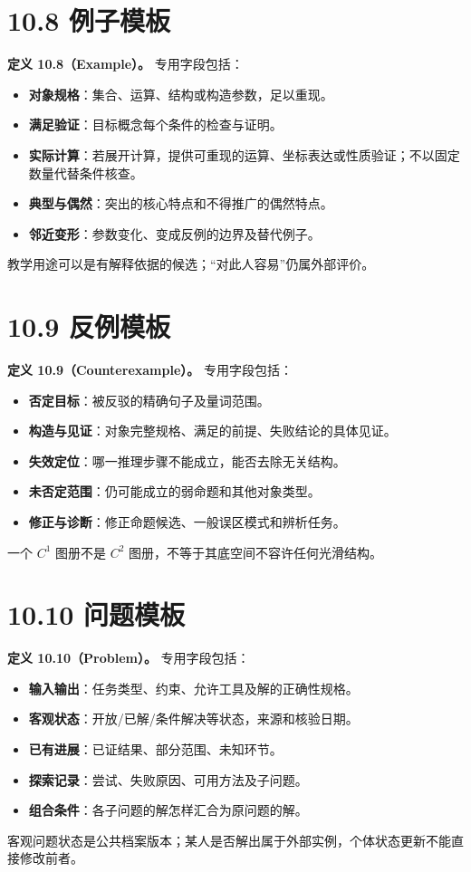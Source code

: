 \documentclass[UTF8,a4paper,zihao=-4,fontset=windows,openany]{ctexbook}
\begin{document}
\section{10.8 例子模板}
\textbf{定义 10.8（Example）。} 专用字段包括：

\begin{itemize}
\item \textbf{对象规格}：集合、运算、结构或构造参数，足以重现。
\item \textbf{满足验证}：目标概念每个条件的检查与证明。
\item \textbf{实际计算}：若展开计算，提供可重现的运算、坐标表达或性质验证；不以固定数量代替条件核查。
\item \textbf{典型与偶然}：突出的核心特点和不得推广的偶然特点。
\item \textbf{邻近变形}：参数变化、变成反例的边界及替代例子。
\end{itemize}
教学用途可以是有解释依据的候选；“对此人容易”仍属外部评价。

\section{10.9 反例模板}
\textbf{定义 10.9（Counterexample）。} 专用字段包括：

\begin{itemize}
\item \textbf{否定目标}：被反驳的精确句子及量词范围。
\item \textbf{构造与见证}：对象完整规格、满足的前提、失败结论的具体见证。
\item \textbf{失效定位}：哪一推理步骤不能成立，能否去除无关结构。
\item \textbf{未否定范围}：仍可能成立的弱命题和其他对象类型。
\item \textbf{修正与诊断}：修正命题候选、一般误区模式和辨析任务。
\end{itemize}
一个 \(C^1\) 图册不是 \(C^2\) 图册，不等于其底空间不容许任何光滑结构。

\section{10.10 问题模板}
\textbf{定义 10.10（Problem）。} 专用字段包括：

\begin{itemize}
\item \textbf{输入输出}：任务类型、约束、允许工具及解的正确性规格。
\item \textbf{客观状态}：开放/已解/条件解决等状态，来源和核验日期。
\item \textbf{已有进展}：已证结果、部分范围、未知环节。
\item \textbf{探索记录}：尝试、失败原因、可用方法及子问题。
\item \textbf{组合条件}：各子问题的解怎样汇合为原问题的解。
\end{itemize}
客观问题状态是公共档案版本；某人是否解出属于外部实例，个体状态更新不能直接修改前者。
\end{document}
